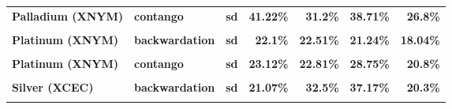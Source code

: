 \documentclass[
  authoryear,
  preprint,
  3p]{elsarticle}
\begin{document}
\begin{longtable}[t]{>{}l>{}l>{}l>{}r>{}r>{}r>{}r}
\textbf{Palladium (XNYM)} & \textbf{contango} & \textbf{sd} & \textcolor[HTML]{4285f4}{\textbf{41.22\%}} & \textcolor[HTML]{4285f4}{\textbf{31.2\%}} & \textcolor[HTML]{4285f4}{\textbf{38.71\%}} & \textcolor[HTML]{4285f4}{\textbf{26.8\%}}\\
\textbf{\cellcolor{gray!10}{Platinum (XNYM)}} & \textbf{\cellcolor{gray!10}{backwardation}} & \textbf{\cellcolor{gray!10}{mean}} & \textcolor[HTML]{4285f4}{\textbf{\cellcolor{gray!10}{**29.46\%}}} & \textcolor[HTML]{4285f4}{\textbf{\cellcolor{gray!10}{*25.07\%}}} & \textcolor[HTML]{4285f4}{\textbf{\cellcolor{gray!10}{10.46\%}}} & \textcolor[HTML]{4285f4}{\textbf{\cellcolor{gray!10}{1.17\%}}}\\
\textbf{Platinum (XNYM)} & \textbf{backwardation} & \textbf{sd} & \textcolor[HTML]{4285f4}{\textbf{22.1\%}} & \textcolor[HTML]{4285f4}{\textbf{22.51\%}} & \textcolor[HTML]{4285f4}{\textbf{21.24\%}} & \textcolor[HTML]{4285f4}{\textbf{18.04\%}}\\
\addlinespace
\textbf{\cellcolor{gray!10}{Platinum (XNYM)}} & \textbf{\cellcolor{gray!10}{contango}} & \textbf{\cellcolor{gray!10}{mean}} & \textcolor[HTML]{4285f4}{\textbf{\cellcolor{gray!10}{-3.22\%}}} & \textcolor[HTML]{4285f4}{\textbf{\cellcolor{gray!10}{-3.81\%}}} & \textcolor[HTML]{4285f4}{\textbf{\cellcolor{gray!10}{8.04\%}}} & \textcolor[HTML]{4285f4}{\textbf{\cellcolor{gray!10}{-17.28\%}}}\\
\textbf{Platinum (XNYM)} & \textbf{contango} & \textbf{sd} & \textcolor[HTML]{4285f4}{\textbf{23.12\%}} & \textcolor[HTML]{4285f4}{\textbf{22.81\%}} & \textcolor[HTML]{4285f4}{\textbf{28.75\%}} & \textcolor[HTML]{4285f4}{\textbf{20.8\%}}\\
\textbf{\cellcolor{gray!10}{Silver (XCEC)}} & \textbf{\cellcolor{gray!10}{backwardation}} & \textbf{\cellcolor{gray!10}{mean}} & \textcolor[HTML]{4285f4}{\textbf{\cellcolor{gray!10}{5.98\%}}} & \textcolor[HTML]{4285f4}{\textbf{\cellcolor{gray!10}{14.29\%}}} & \textcolor[HTML]{4285f4}{\textbf{\cellcolor{gray!10}{19.66\%}}} & \textcolor[HTML]{4285f4}{\textbf{\cellcolor{gray!10}{3.44\%}}}\\
\textbf{Silver (XCEC)} & \textbf{backwardation} & \textbf{sd} & \textcolor[HTML]{4285f4}{\textbf{21.07\%}} & \textcolor[HTML]{4285f4}{\textbf{32.5\%}} & \textcolor[HTML]{4285f4}{\textbf{37.17\%}} & \textcolor[HTML]{4285f4}{\textbf{20.3\%}}\\
\textbf{\cellcolor{gray!10}{Silver (XCEC)}} & \textbf{\cellcolor{gray!10}{contango}} & \textbf{\cellcolor{gray!10}{mean}} & \textcolor[HTML]{4285f4}{\textbf{\cellcolor{gray!10}{6.57\%}}} & \textcolor[HTML]{4285f4}{\textbf{\cellcolor{gray!10}{20.83\%}}} & \textcolor[HTML]{4285f4}{\textbf{\cellcolor{gray!10}{26.77\%}}} & \textcolor[HTML]{4285f4}{\textbf{\cellcolor{gray!10}{-8.09\%}}}\\

\end{longtable}
\end{document}
